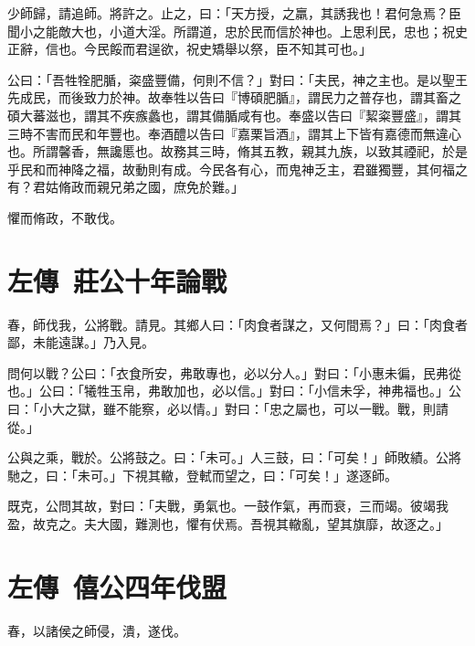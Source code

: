 少師歸，請追師。將許之。止之，曰：「天方授，之羸，其誘我也！君何急焉？臣聞小之能敵大也，小道大淫。所謂道，忠於民而信於神也。上思利民，忠也；祝史正辭，信也。今民餒而君逞欲，祝史矯舉以祭，臣不知其可也。」

公曰：「吾牲牷肥腯，粢盛豐備，何則不信？」對曰：「夫民，神之主也。是以聖王先成民，而後致力於神。故奉牲以告曰『博碩肥腯』，謂民力之普存也，謂其畜之碩大蕃滋也，謂其不疾瘯蠡也，謂其備腯咸有也。奉盛以告曰『絜粢豐盛』，謂其三時不害而民和年豐也。奉酒醴以告曰『嘉栗旨酒』，謂其上下皆有嘉德而無違心也。所謂馨香，無讒慝也。故務其三時，脩其五教，親其九族，以致其禋祀，於是乎民和而神降之福，故動則有成。今民各有心，而鬼神乏主，君雖獨豐，其何福之有？君姑脩政而親兄弟之國，庶免於難。」

懼而脩政，不敢伐。

\theendnotes

\section[曹劌論戰\quad{\small 左傳\ 莊公十年}]{{\normalsize 左傳\ 莊公十年}\quad {}論戰}
春，師伐我，公將戰。請見。其鄉人曰：「肉食者謀之，又何間焉？」曰：「肉食者鄙，未能遠謀。」乃入見。

問何以戰？公曰：「衣食所安，弗敢專也，必以分人。」對曰：「小惠未徧，民弗從也。」公曰：「犧牲玉帛，弗敢加也，必以信。」對曰：「小信未孚，神弗福也。」公曰：「小大之獄，雖不能察，必以情。」對曰：「忠之屬也，可以一戰。戰，則請從。」

公與之乘，戰於。公將鼓之。曰：「未可。」人三鼓，曰：「可矣！」師敗績。公將馳之，曰：「未可。」下視其轍，登軾而望之，曰：「可矣！」遂逐師。

既克，公問其故，對曰：「夫戰，勇氣也。一鼓作氣，再而衰，三而竭。彼竭我盈，故克之。夫大國，難測也，懼有伏焉。吾視其轍亂，望其旗靡，故逐之。」

\theendnotes

\section[齊桓公伐楚盟屈完\quad{\small 左傳\ 僖公四年}]{{\normalsize 左傳\ 僖公四年}\quad {}伐盟}
春，以諸侯之師侵，潰，遂伐。

